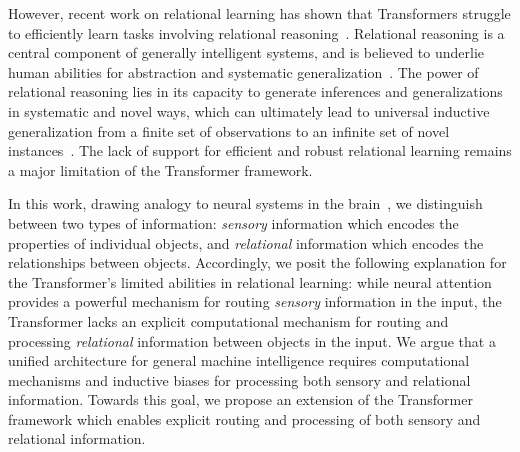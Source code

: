 However, recent work on relational learning has shown that Transformers struggle to efficiently learn tasks involving relational reasoning~\citep{lake2018generalization,barrett2018measuring,santoroSimpleNeuralNetwork2017,santoroRelationalRecurrentNeural2018,shanahanExplicitlyRelationalNeurala,webbEmergentSymbolsBinding2021,webbRelationalBottleneckInductive2024,kergNeuralArchitectureInductive2022,altabaa2024abstractors,altabaaLearningHierarchicalRelational2024}. Relational reasoning is a central component of generally intelligent systems, and is believed to underlie human abilities for abstraction and systematic generalization~\citep{snow1984topography,kemp2008discovery,holyoak2012analogy}. The power of relational reasoning lies in its capacity to generate inferences and generalizations in systematic and novel ways, which can ultimately lead to universal inductive generalization from a finite set of observations to an infinite set of novel instances~\citep{goyal2022inductive}. The lack of support for efficient and robust relational learning remains a major limitation of the Transformer framework.

In this work, drawing analogy to neural systems in the brain~\citep{newman1997neural}, we distinguish between two types of information: \textit{sensory} information which encodes the properties of individual objects, and \textit{relational} information which encodes the relationships between objects. Accordingly, we posit the following explanation for the Transformer's limited abilities in relational learning: while neural attention provides a powerful mechanism for routing \textit{sensory} information in the input, the Transformer lacks an explicit computational mechanism for routing and processing \textit{relational} information between objects in the input. We argue that a unified architecture for general machine intelligence requires computational mechanisms and inductive biases for processing both sensory and relational information. Towards this goal, we propose an extension of the Transformer framework which enables explicit routing and processing of both sensory and relational information.

